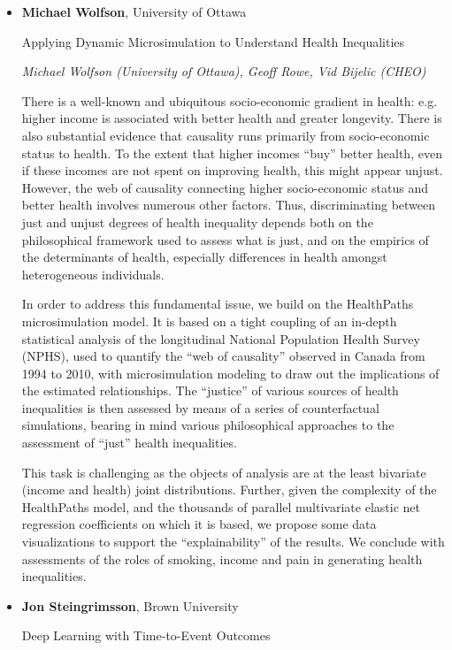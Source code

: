 \begin{itemize}
\item \textbf{Michael Wolfson}, University of Ottawa

Applying Dynamic Microsimulation to Understand Health Inequalities

\emph{\footnotesize Michael Wolfson (University of Ottawa), Geoff Rowe, Vid Bijelic (CHEO)}

There is a well-known and ubiquitous socio-economic gradient in health: e.g. higher income is associated with better health and greater longevity.  There is also substantial evidence that causality runs primarily from socio-economic status to health.  To the extent that higher incomes “buy” better health, even if these incomes are not spent on improving health, this might appear unjust.  However, the web of causality connecting higher socio-economic status and better health involves numerous other factors.  Thus, discriminating between just and unjust degrees of health inequality depends both on the philosophical framework used to assess what is just, and on the empirics of the determinants of health, especially differences in health amongst heterogeneous individuals.

In order to address this fundamental issue, we build on the HealthPaths microsimulation model.  It is based on a tight coupling of an in-depth statistical analysis of the longitudinal National Population Health Survey (NPHS), used to quantify the “web of causality” observed in Canada from 1994 to 2010, with microsimulation modeling to draw out the implications of the estimated relationships.  The “justice” of various sources of health inequalities is then assessed by means of a series of counterfactual simulations, bearing in mind various philosophical approaches to the assessment of “just” health inequalities. 

This task is challenging as the objects of analysis are at the least bivariate (income and health) joint distributions.  Further, given the complexity of the HealthPaths model, and the thousands of parallel multivariate elastic net regression coefficients on which it is based, we propose some data visualizations to support the “explainability” of the results.  We conclude with assessments of the roles of smoking, income and pain in generating health inequalities.

\item \textbf{Jon Steingrimsson}, Brown University

Deep Learning with Time-to-Event Outcomes


\end{itemize}
